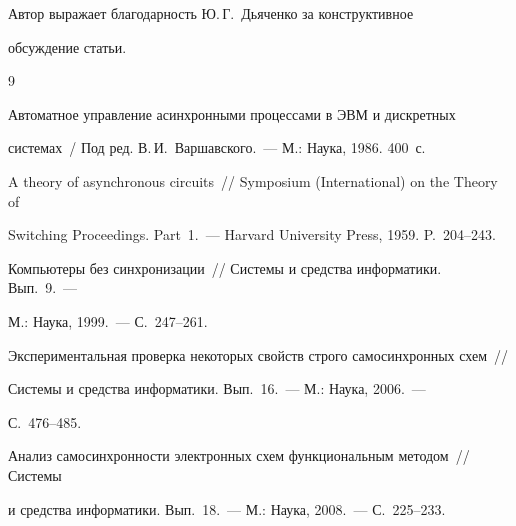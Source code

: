 \bigskip


Автор выражает благодарность Ю.\,Г.~Дьяченко за конструктивное 


обсуждение статьи.





{\frenchspacing\small




\begin{thebibliography}{9}







Автоматное управление асинхронными процессами в ЭВМ и дискретных 


системах~/ Под ред. В.\,И.~Варшавского.~--- М.: Наука, 1986.  400~с.









A theory of asynchronous circuits~//  Symposium (International) on the Theory  of 


Switching Proceedings. Part~1.~--- Harvard University Press, 1959. P.~204--243.









Компьютеры без синхронизации~// Системы и средства информатики. Вып.~9.~--- 


М.: Наука, 1999.~--- С.~247--261.









Экспериментальная проверка некоторых свойств строго самосинхронных схем~// 


Системы и средства информатики. Вып.~16.~--- М.: Наука, 2006.~--- 


С.~476--485.









Анализ самосинхронности электронных схем функциональным методом~// Системы 


и средства информатики. Вып.~18.~--- М.: Наука, 2008.~--- С.~225--233.






\end{thebibliography}}
